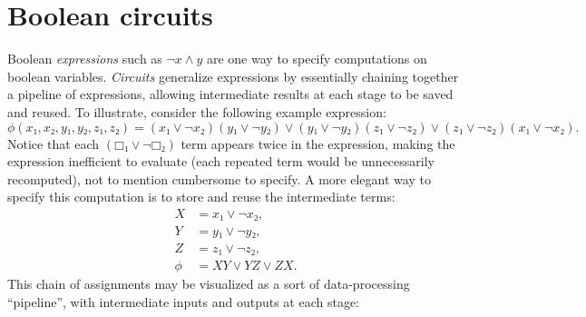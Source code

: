 


\section{Boolean circuits}

Boolean \emph{expressions} such as \(¬x∧y\) are one way to specify computations
on boolean variables.  \emph{Circuits} generalize expressions by essentially
chaining together a pipeline of expressions, allowing intermediate results at
each stage to be saved and reused.  To illustrate, consider the following
example expression:
\[
  ϕ(x₁,x₂,y₁,y₂,z₁,z₂)
  = (x₁∨¬x₂)(y₁∨¬y₂) ∨ (y₁∨¬y₂)(z₁∨¬z₂) ∨ (z₁∨¬z₂)(x₁∨¬x₂).
\]
Notice that each \((□₁∨¬□₂)\) term appears twice in the expression, making the
expression inefficient to evaluate (each repeated term would be unnecessarily
recomputed), not to mention cumbersome to specify.  A more elegant way to
specify this computation is to store and reuse the intermediate terms:
\begin{align*}
  X &= x₁∨¬x₂, \\
  Y &= y₁∨¬y₂, \\
  Z &= z₁∨¬z₂, \\
  ϕ &= XY∨YZ∨ZX.
\end{align*}
This chain of assignments may be visualized as a sort of data-processing
``pipeline'', with intermediate inputs and outputs at each stage:
\begin{center}
  \begin{tikzpicture}



  \end{tikzpicture}
\end{center}



%
%
%
%




